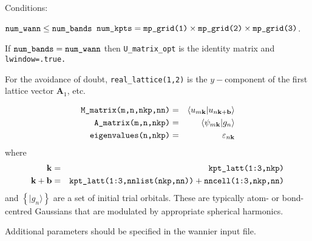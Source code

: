 Conditions:
\begin{itemize}
\cond $\verb#num_wann# \le \verb#num_bands#$
\cond $\verb#num_kpts# = \verb#mp_grid(1)# \times \verb#mp_grid(2)#
\times \verb#mp_grid(3)#$.
\end{itemize}

If $\verb#num_bands# = \verb#num_wann#$ then \verb#U_matrix_opt# is the identity matrix and
\verb#lwindow=.true.#

For the avoidance of doubt, \verb#real_lattice(1,2)# is the
$y-$component of the first lattice 
vector $\mathbf{A}_{1}$, etc.

\begin{eqnarray*}
\verb#M_matrix(m,n,nkp,nn)# & = & \left\langle u_{m\mathbf{k}} |
u_{n\mathbf{k+b}}\right\rangle\\
\verb#A_matrix(m,n,nkp)# & = &
\left\langle \psi_{m\mathbf{k}}|g_{n}\right\rangle\\
\verb#eigenvalues(n,nkp)# &=& \varepsilon_{n\mathbf{k}}
\end{eqnarray*}
where
\begin{eqnarray*}
\mathbf{k} &=&\verb#kpt_latt(1:3,nkp)#\\
\mathbf{k+b}&=& \verb#kpt_latt(1:3,nnlist(nkp,nn))# +
\verb#nncell(1:3,nkp,nn)# 
\end{eqnarray*}
and
$\left\{|g_{n}\rangle\right\}$ are a set of initial trial
orbitals. These are
typically atom- or bond-centred Gaussians that are modulated by
appropriate spherical harmonics. 

Additional parameters should be specified in the wannier input
file.

